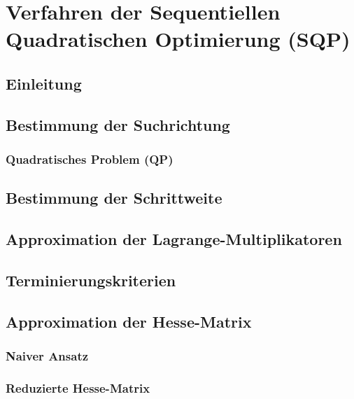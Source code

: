 	\section{Verfahren der Sequentiellen Quadratischen Optimierung (SQP)} %

		\subsection{Einleitung} %

		\subsection{Bestimmung der Suchrichtung} %

			\subsubsection{Quadratisches Problem (QP)} %

		\subsection{Bestimmung der Schrittweite} %

		\subsection{Approximation der Lagrange-Multiplikatoren} %

		\subsection{Terminierungskriterien} %

		\subsection{Approximation der Hesse-Matrix} %

			\subsubsection{Naiver Ansatz} %

			\subsubsection{Reduzierte Hesse-Matrix} %

